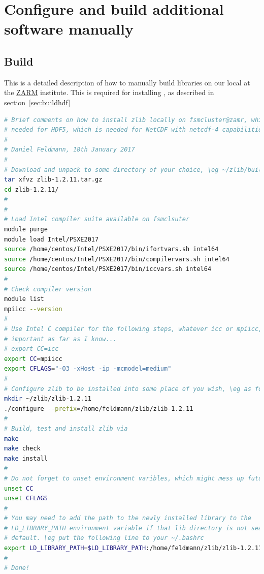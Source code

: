 \documentclass[a4paper, 11pt, DIV=11]{scrartcl}
\begin{document}
\section{Configure and build additional software manually}
\label{app:selfBuildLibraries}

\subsection{Build }
\label{sec:buildzlib}

This is a detailed description of how to manually build 
libraries on our local  at the
\href{https://www.zarm.uni-bremen.de/en/}{ZARM} institute. This is required
for installing \hdf, as described in section~\ref{sec:buildhdf}

\begin{lstlisting}[language=bash]
# Brief comments on how to install zlib locally on fsmcluster@zamr, which is
# needed for HDF5, which is needed for NetCDF with netcdf-4 capabilities.
#
# Daniel Feldmann, 18th January 2017
#
# Download and unpack to some directory of your choice, \eg ~/zlib/build
tar xfvz zlib-1.2.11.tar.gz
cd zlib-1.2.11/
#
#
# Load Intel compiler suite available on fsmclsuter
module purge
module load Intel/PSXE2017
source /home/centos/Intel/PSXE2017/bin/ifortvars.sh intel64
source /home/centos/Intel/PSXE2017/bin/compilervars.sh intel64
source /home/centos/Intel/PSXE2017/bin/iccvars.sh intel64
#
# Check compiler version
module list
mpiicc --version
#
# Use Intel C compiler for the following steps, whatever icc or mpiicc, is not
# important as far as I know...
# export CC=icc
export CC=mpiicc
export CFLAGS="-O3 -xHost -ip -mcmodel=medium"
#
# Configure zlib to be installed into some place of you wish, \eg as follows
mkdir ~/zlib/zlib-1.2.11
./configure --prefix=/home/feldmann/zlib/zlib-1.2.11
#
# Build, test and install zlib via
make
make check
make install
#
# Do not forget to unset environment varibles, which might mess up future builds
unset CC
unset CFLAGS
#
# You may need to add the path to the newly installed library to the
# LD_LIBRARY_PATH environment variable if that lib directory is not searched by
# default. \eg put the following line to your ~/.bashrc
export LD_LIBRARY_PATH=$LD_LIBRARY_PATH:/home/feldmann/zlib/zlib-1.2.11/lib
#
# Done!
\end{lstlisting}
\end{document}
